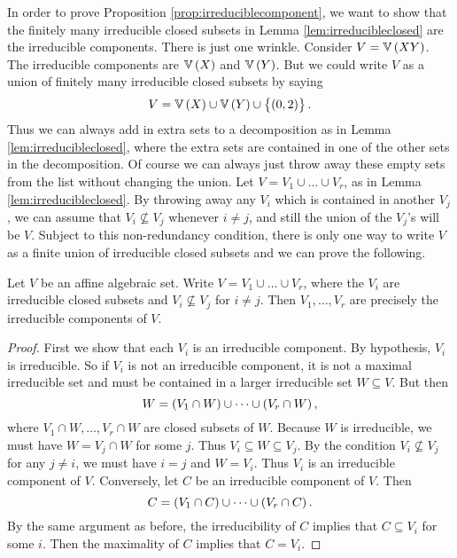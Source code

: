 In order to prove Proposition \ref{prop:irreduciblecomponent}, we want to show that the finitely many irreducible closed subsets in Lemma \ref{lem:irreducibleclosed} are the irreducible components. There is just one wrinkle. Consider $ V = \VV\br{XY} $. The irreducible components are $ \VV\br{X} $ and $ \VV\br{Y} $. But we could write $ V $ as a union of finitely many irreducible closed subsets by saying
$$ V = \VV\br{X} \cup \VV\br{Y} \cup \cbr{\br{0, 2}}. $$
Thus we can always add in extra sets to a decomposition as in Lemma \ref{lem:irreducibleclosed}, where the extra sets are contained in one of the other sets in the decomposition. Of course we can always just throw away these empty sets from the list without changing the union. Let $ V = V_1 \cup \dots \cup V_r $, as in Lemma \ref{lem:irreducibleclosed}. By throwing away any $ V_i $ which is contained in another $ V_j $, we can assume that $ V_i \not\subseteq V_j $ whenever $ i \ne j $, and still the union of the $ V_j $'s will be $ V $. Subject to this non-redundancy condition, there is only one way to write $ V $ as a finite union of irreducible closed subsets and we can prove the following.

\begin{proposition}
\label{prop:irreducibleclosed}
Let $ V $ be an affine algebraic set. Write $ V = V_1 \cup \dots \cup V_r $, where the $ V_i $ are irreducible closed subsets and $ V_i \not\subseteq V_j $ for $ i \ne j $. Then $ V_1, \dots, V_r $ are precisely the irreducible components of $ V $.
\end{proposition}

\begin{proof}
First we show that each $ V_i $ is an irreducible component. By hypothesis, $ V_i $ is irreducible. So if $ V_i $ is not an irreducible component, it is not a maximal irreducible set and must be contained in a larger irreducible set $ W \subseteq V $. But then
$$ W = \br{V_1 \cap W} \cup \dots \cup \br{V_r \cap W}, $$
where $ V_1 \cap W, \dots, V_r \cap W $ are closed subsets of $ W $. Because $ W $ is irreducible, we must have $ W = V_j \cap W $ for some $ j $. Thus $ V_i \subseteq W \subseteq V_j $. By the condition $ V_i \not\subseteq V_j $ for any $ j \ne i $, we must have $ i = j $ and $ W = V_i $. Thus $ V_i $ is an irreducible component of $ V $. Conversely, let $ C $ be an irreducible component of $ V $. Then
$$ C = \br{V_1 \cap C} \cup \dots \cup \br{V_r \cap C}. $$
By the same argument as before, the irreducibility of $ C $ implies that $ C \subseteq V_i $ for some $ i $. Then the maximality of $ C $ implies that $ C = V_i $.
\end{proof}

